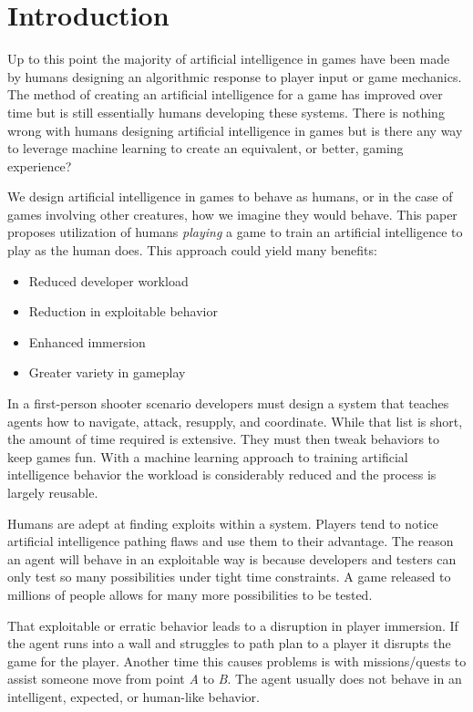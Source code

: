 \documentclass[12pt]{thesis}
\begin{document}
\body


\chapter{Introduction}
Up to this point the majority of artificial intelligence in games have been 
made by humans designing an algorithmic response to player input or game 
mechanics\cite{NestedIF}. The method of creating an artificial intelligence for 
a game has improved over time\cite{AdvancedIF} but is still essentially humans 
developing these systems. There is nothing wrong with humans designing 
artificial intelligence in games but is there any way to leverage machine 
learning to create an equivalent, or better, gaming experience?

We design artificial intelligence in games to behave as humans, or in the case 
of games involving other creatures, how we imagine they would behave. This 
paper proposes utilization of humans \textit{playing} a game to train an 
artificial intelligence to play as the human does. This approach could yield 
many benefits:

\begin{itemize}
    \item Reduced developer workload
    \item Reduction in exploitable behavior
    \item Enhanced immersion
    \item Greater variety in gameplay
\end{itemize}

In a first-person shooter scenario developers must design a system that teaches 
agents how to navigate, attack, resupply, and coordinate. While that list is 
short, the amount of time required is extensive. They must then tweak behaviors 
to keep games fun\cite{Fairness}. With a machine learning approach to training 
artificial intelligence behavior the workload is considerably reduced and the 
process is largely reusable. 

Humans are adept at finding exploits within a system. Players tend to notice 
artificial intelligence pathing flaws and use them to their advantage. The 
reason an agent will behave in an exploitable way is because developers and 
testers can only test so many possibilities under tight time constraints. A 
game released to millions of people allows for many more possibilities to be 
tested. 

That exploitable or erratic behavior leads to a disruption in player immersion. 
If the agent runs into a wall and struggles to path plan to a player it 
disrupts the game for the player. Another time this causes problems is with 
missions/quests to assist someone move from point \textit{A} to \textit{B}. The 
agent usually does not behave in an intelligent, expected, or human-like 
behavior. 
\end{document}

